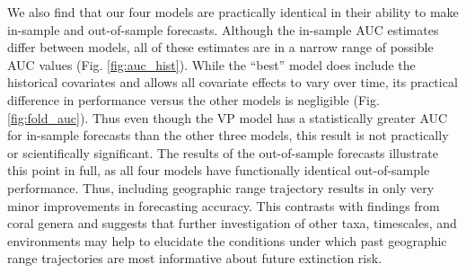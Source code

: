 \documentclass[12pt,letterpaper]{article}
\begin{document}
\begin{refsection}

We also find that our four models are practically identical in their ability to make in-sample and out-of-sample forecasts. Although the in-sample AUC estimates differ between models, all of these estimates are in a narrow range of possible AUC values (Fig. \ref{fig:auc_hist}). While the ``best'' model does include the historical covariates and allows all covariate effects to vary over time, its practical difference in performance versus the other models is negligible (Fig. \ref{fig:fold_auc}). Thus even though the VP model has a statistically greater AUC for in-sample forecasts than the other three models, this result is not practically or scientifically significant. The results of the out-of-sample forecasts illustrate this point in full, as all four models have functionally identical out-of-sample performance. Thus, including geographic range trajectory results in only very minor improvements in forecasting accuracy. This contrasts with findings from coral genera \citep{Kiessling2016} and suggests that further investigation of other taxa, timescales, and environments may help to elucidate the conditions under which past geographic range trajectories are most informative about future extinction risk.



\end{refsection}
\end{document}
